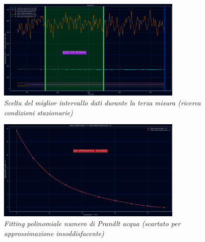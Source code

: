 \documentclass[a4paper,10pt]{article}                                                                                       %
\begin{document}
\begin{figure}[H]                                                                                                           %
  \caption{\textit{Scelta del miglior intervallo dati durante la terza misura (ricerca condizioni stazionarie)}}            %
  \label{fig:measure1}                                                                                                      %
  \vspace{3mm}                                                                                                              %
  \centering                                                                                                                %
  \includegraphics[width=0.8\textwidth]{../final_doc/code_exports/imgs/measure3.png}                                        %
\end{figure}                                                                                                                %
\begin{figure}[H]                                                                                                           %
  \caption{\textit{Fitting polinomiale numero di Prandlt acqua (scartato per approssimazione insoddisfacente)}}             %
  \label{fig:water_fitted_pr}                                                                                               %
  \vspace{3mm}                                                                                                              %
  \centering                                                                                                                %
  \includegraphics[width=0.8\textwidth]{../final_doc/code_exports/imgs/water_fitted_pr.png}                                 %
\end{figure}                                                                                                                %
\end{document}
